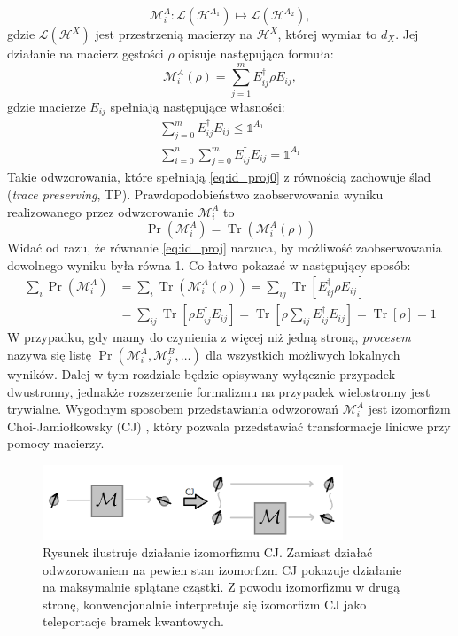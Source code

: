 \documentclass[10pt]{article} %
\DeclareMathOperator{\Trs}{Tr}
\newcommand{\Mats}[1]{\mathcal{L}(#1)}
\newcommand{\Hx}[1]{\mathcal{H}^{#1}}
\newcommand{\LHx}[1]{\Mats{\Hx{#1}}}
\newcommand{\MXi}[3]{\mathcal{M}^{#1}_{#2}(#3)}
\newcommand{\MXin}[2]{\mathcal{M}^{#1}_{#2}}
\newcommand{\MAin}[0]{\MXin{A}{i}}
\newcommand{\MAi}[1]{\MXi{A}{i}{#1}}
\newcommand{\MAir}{\MAi{\rho}}
\newcommand{\Idx}[1]{\mathbb{1}^{#1}}
\newcommand{\Tr}[1]{\Trs(#1)}
\newcommand{\Pro}[1]{\Pr(#1)}
\begin{document}
\begin{equation}
\mathcal{M}^A_i : \mathcal{L}(\mathcal{H}^{A_1}) \mapsto \mathcal{L}(\mathcal{H}^{A_2}),
\end{equation}
gdzie $\LHx{X}$ jest przestrzenią macierzy na $\Hx{X}$, której wymiar to $d_X$. Jej działanie na macierz gęstości $\rho$ opisuje następująca formuła:
\begin{equation}
\label{yolo}
\MAi{\rho} = \sum^m_{j=1} E_{ij} ^\dag \rho E_{ij},
\end{equation}
gdzie macierze $E_{ij}$ spełniają następujące własności:
\begin{gather}
\label{eq:id_proj0} 
\sum^m_{j=0} E_{ij}^\dag E_{ij} \leq \Idx{A_1} \\
\label{eq:id_proj} 
\sum^n_{i=0} \sum^m_{j=0} E_{ij}^\dag E_{ij} = \Idx{A_1}
\end{gather}
Takie odwzorowania, które spełniają \eqref{eq:id_proj0} z równością zachowuje ślad (\textit{trace preserving}, TP).
Prawdopodobieństwo zaobserwowania wyniku realizowanego przez odwzorowanie $\MAin$ to
\begin{equation}
\label{eq:probqi}
\Pro{\MAin} = \Tr{\MAir}
\end{equation}
Widać od razu, że równanie \eqref{eq:id_proj} narzuca, by możliwość zaobserwowania dowolnego wyniku była równa 1. Co łatwo pokazać w następujący sposób:
\begin{equation}
\begin{split}
\sum_i \Pro{\MAin} &= \sum_i \Tr{\MAir} = \sum_{ij} \Trs \left[E^\dag_{ij}\rho E_{ij}\right]\\ &= \sum_{ij} \Trs\left[ \rho E^\dag_{ij}E_{ij}\right] = \Trs \left[ \rho \sum_{ij}  E^\dag_{ij}E_{ij}\right] = \Trs \left[ \rho \right] = 1
\end{split}
\end{equation}
W przypadku, gdy mamy do czynienia z więcej niż jedną stroną, \textit{procesem} nazywa się listę $\Pr(\MXin{A}{i}, \MXin{B}{j}, \dots)$ dla wszystkich możliwych lokalnych wyników. Dalej w tym rozdziale będzie opisywany wyłącznie przypadek dwustronny, jednakże rozszerzenie formalizmu na przypadek wielostronny jest trywialne. Wygodnym sposobem przedstawiania odwzorowań $\MAin$ jest izomorfizm Choi-Jamiołkowsky (CJ) \cite{cj_iso1, cj_iso2}, który pozwala przedstawiać transformacje liniowe przy pomocy macierzy. 
\begin{figure}[t]
\centering
\includegraphics[width=0.8\textwidth]{obrazki/cj_new}
\caption{Rysunek ilustruje działanie izomorfizmu CJ. Zamiast działać odwzorowaniem na pewien stan izomorfizm CJ pokazuje działanie na maksymalnie splątane cząstki. Z powodu izomorfizmu w drugą stronę, konwencjonalnie interpretuje się izomorfizm CJ jako teleportacje bramek kwantowych.}
\end{figure}
\end{document}
